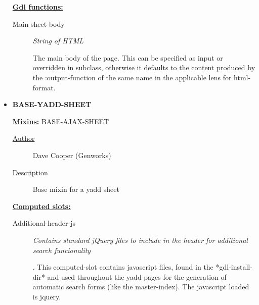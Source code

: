 \documentclass [11pt]{book}
\begin{document}
\begin{itemize}
\begin{description}
\end{description}






\textbf{
\underline{Gdl functions:}}

\begin{description}

\item [Main-sheet-body]
\emph{String of HTML}

 The main body of the page.
This can be specified as input or overridden in subclass, otherwise it defaults
to the content produced by the :output-function of the same name
in the applicable lens for  html-format.




\end{description}







\item {}
\textbf{BASE-YADD-SHEET}


\textbf{
\underline{Mixins:}} BASE-AJAX-SHEET





\begin{description}

\item [
\underline{Author}]


Dave Cooper (Genworks)



\item [
\underline{Description}]


Base mixin for a yadd sheet



\end{description}








\textbf{
\underline{Computed slots:}}

\begin{description}

\item [Additional-header-js]
\emph{Contains standard jQuery files to include in the header for additional search funcionality}

.
This computed-slot contains javascript files, found in the *gdl-install-dir*
and used throughout the yadd pages for the generation of automatic search forms (like the master-index).
The javascript loaded is jquery.





\end{description}
\end{itemize}
\end{document}
